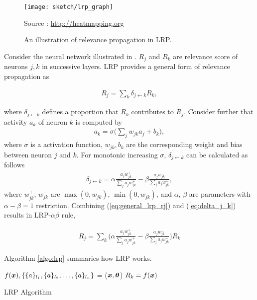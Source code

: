  \begin{figure}[!hbt]
	\begin{center}
		\texttt{[image: sketch/lrp\_graph]}
		\caption{An illustration of relevance propagation in LRP.}
		\small{
			Source : \url{http://heatmapping.org}
			}
		\label{fig:lrp_graph}
	\end{center}
\end{figure}

Consider the neural network illustrated in \addfigure{\ref{fig:lrp_graph}}. $R_j$ and $R_k$ are relevance score of  neurons $j,k$ in successive layers.  LRP provides a general form of relevance propagation as 

\begin{align} \label{eq:general_lrp_rj}
	R_j = \sum_{k} 	\delta_{j\leftarrow k} R_{k} ,
\end{align}

where $\delta_{j\leftarrow k}$ defines a proportion that  $R_{k}$ contributes to $R_j$. Consider further that activity $a_k$ of neuron $k$ is computed by 
\begin{align}
	a_k = \sigma \bigg( \sum_{j} w_{jk} a_j + b_k \bigg),
\end{align} 
where $\sigma$ is a activation function, $w_{jk}, b_k$ are the corresponding weight and bias between neuron $j$ and $k$. For monotonic increasing $\sigma$, $\delta_{j\leftarrow k}$ can be calculated as follows 
\begin{align} \label{eq:delta_j_k}
	\delta_{j\leftarrow k} = \alpha\frac{a_j w_{jk}^+}{\sum_{j} a_jw_{jk}^+} - \beta\frac{a_j w_{jk}^-}{\sum_{j} a_jw_{jk}^-},
\end{align}
where $w_{jk}^+$, $w_{jk}^-$ are $\max(0, w_{jk})$, $\min(0, w_{jk})$, and $\alpha$,  $\beta$ are parameters with $\alpha-\beta = 1$ restriction. Combining (\ref{eq:general_lrp_rj}) and (\ref{eq:delta_j_k}) results in LRP-$\alpha\beta$ rule, 

\begin{align}
	R_j = \sum_{k} 	\bigg( \alpha\frac{a_j w_{jk}^+}{\sum_{j} a_jw_{jk}^+} - \beta\frac{a_j w_{jk}^-}{\sum_{j} a_jw_{jk}^-} \bigg )  R_{k}
\end{align}

Algorithm \ref{algo:lrp} summaries how LRP works.

\begin{algorithm}[H]
$f(\patvector{x}), \{ \{a\}_{l_1}, \{a\}_{l_2}, \dots, \{a\}_{l_n}\}$ = ($\patvector{x}, \patvector{\theta}$)\;
$R_k = f(\patvector{x})$\;
 \caption{LRP Algorithm}
 \label{algo:lrp}
\end{algorithm}


